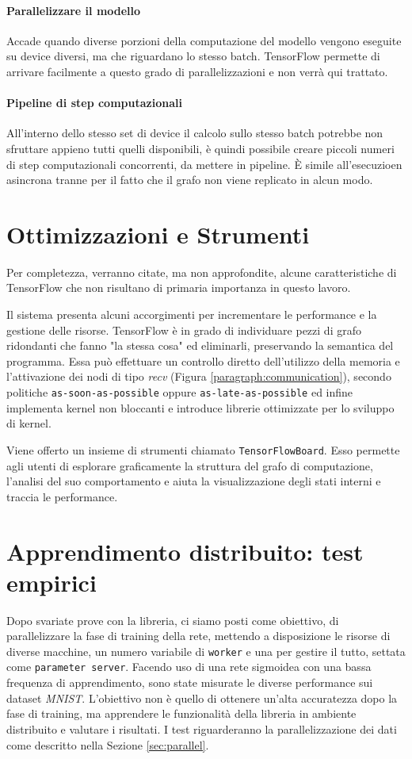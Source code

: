 \documentclass[DIV=calc, paper=a4, fontsize=11pt]{scrartcl}	 %
\begin{document}
\begin{multicols}{2}
			\paragraph{Parallelizzare il modello} Accade quando diverse porzioni della computazione del modello vengono eseguite su device diversi, ma che riguardano lo stesso batch. TensorFlow permette di arrivare facilmente a questo grado di parallelizzazioni e non verrà qui trattato.
			\paragraph{Pipeline di step computazionali} All'interno dello stesso set di device il calcolo sullo stesso batch potrebbe non sfruttare appieno tutti quelli disponibili, è quindi possibile creare piccoli numeri di step computazionali concorrenti, da mettere in pipeline. È simile all'esecuzioen asincrona tranne per il fatto che il grafo non viene replicato in alcun modo.			
		
		\section{Ottimizzazioni e Strumenti}
		Per completezza, verranno citate, ma non approfondite, alcune caratteristiche di TensorFlow che non risultano di primaria importanza in questo lavoro.
		
		Il sistema presenta alcuni accorgimenti per incrementare le performance e la gestione delle risorse. TensorFlow è in grado di individuare pezzi di grafo ridondanti che fanno "la stessa cosa" ed eliminarli, preservando la semantica del programma. Essa può effettuare un controllo diretto dell'utilizzo della memoria e l'attivazione dei nodi di tipo \textit{recv} (Figura \ref{paragraph:communication}), secondo politiche \texttt{as-soon-as-possible} oppure \texttt{as-late-as-possible} ed infine implementa kernel non bloccanti e introduce librerie ottimizzate per lo sviluppo di kernel.
		
		Viene offerto un insieme di strumenti chiamato \texttt{TensorFlowBoard}. Esso permette agli utenti di esplorare graficamente la struttura del grafo di computazione, l'analisi del suo comportamento e aiuta la visualizzazione degli stati interni e traccia le performance.
				
		\section{Apprendimento distribuito: test empirici}		
		Dopo svariate prove con la libreria, ci siamo posti come obiettivo, di parallelizzare la fase di training della rete, mettendo a disposizione le risorse di diverse macchine, un numero variabile di \texttt{worker} e una per gestire il tutto, settata come \texttt{parameter server}. Facendo uso di una rete sigmoidea con una bassa frequenza di apprendimento, sono state misurate le diverse performance sui dataset \textit{MNIST}. L'obiettivo non è quello di ottenere un'alta accuratezza dopo la fase di training, ma apprendere le funzionalità della libreria in ambiente distribuito e valutare i risultati. I test riguarderanno la parallelizzazione dei dati come descritto nella Sezione \ref{sec:parallel}.
		

\end{multicols}
\end{document}
